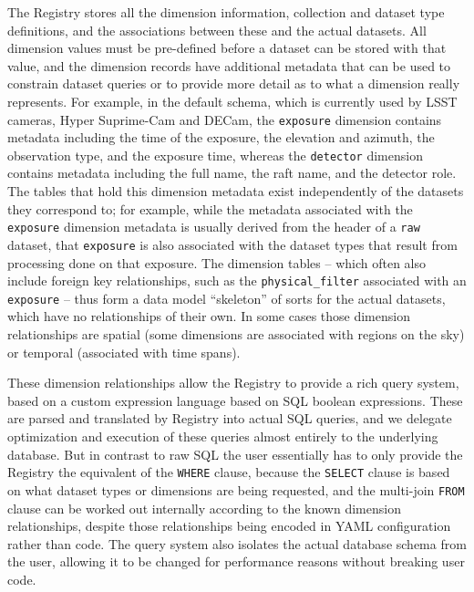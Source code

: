 \documentclass[]{spie}
\begin{document}
The Registry stores all the dimension information, collection and dataset type definitions, and the associations between these and the actual datasets.
All dimension values must be pre-defined before a dataset can be stored with that value, and the dimension records have additional metadata that can be used to constrain dataset queries or to provide more detail as to what a dimension really represents.
For example, in the default schema, which is currently used by LSST cameras, Hyper Suprime-Cam\cite{2018PASJ...70S...1M} and DECam\cite{2015AJ....150..150F}, the \texttt{exposure} dimension contains metadata including the time of the exposure, the elevation and azimuth, the observation type, and the exposure time, whereas the \texttt{detector} dimension contains metadata including the full name, the raft name, and the detector role.
The tables that hold this dimension metadata exist independently of the datasets they correspond to; for example, while the metadata associated with the \texttt{exposure} dimension metadata is usually derived from the header of a \texttt{raw} dataset, that \texttt{exposure} is also associated with the dataset types that result from processing done on that exposure.
The dimension tables -- which often also include foreign key relationships, such as the \texttt{physical\_filter} associated with an \texttt{exposure} -- thus form a data model ``skeleton'' of sorts for the actual datasets, which have no relationships of their own.
In some cases those dimension relationships are spatial (some dimensions are associated with regions on the sky) or temporal (associated with time spans).

These dimension relationships allow the Registry to provide a rich query system, based on a custom expression language based on SQL boolean expressions.
These are parsed and translated by Registry into actual SQL queries, and we delegate optimization and execution of these queries almost entirely to the underlying database.
But in contrast to raw SQL the user essentially has to only provide the Registry the equivalent of the \texttt{WHERE} clause, because the \texttt{SELECT} clause is based on what dataset types or dimensions are being requested, and the multi-join \texttt{FROM} clause can be worked out internally according to the known dimension relationships, despite those relationships being encoded in YAML configuration rather than code.
The query system also isolates the actual database schema from the user, allowing it to be changed for performance reasons without breaking user code.
\end{document}
